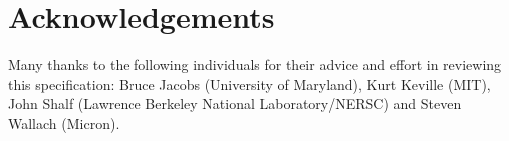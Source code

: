 \documentclass{article}
\begin{document}
\newpage
\section*{Acknowledgements}
\label{Acknowledgements}

Many thanks to the following individuals for their advice and 
effort in reviewing this specification: Bruce Jacobs (University 
of Maryland), Kurt Keville (MIT), John Shalf (Lawrence Berkeley 
National Laboratory/NERSC) and Steven Wallach (Micron).

\newpage
{}



%
\end{document}
